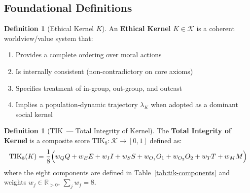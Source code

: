 \documentclass[11pt,a4paper]{article}
\theoremstyle{definition}
\newtheorem{definition}[theorem]{Definition}
\theoremstyle{remark}
\newcommand{\TIKeight}{\text{TIK}_8}
\newcommand{\KernelSpace}{\mathcal{K}}
\begin{document}
\subsection{Foundational Definitions}
\label{sec:tik-defs}

\begin{definition}[Ethical Kernel $K$]
\label{def:kernel}
An \textbf{Ethical Kernel} $K \in \KernelSpace$ is a coherent
worldview/value system that:
\begin{enumerate}[noitemsep, label=(\roman*)]
  \item Provides a complete ordering over moral actions
  \item Is internally consistent (non-contradictory on core axioms)
  \item Specifies treatment of in-group, out-group, and outcast
  \item Implies a population-dynamic trajectory $\lambda_K$
    when adopted as a dominant social kernel
\end{enumerate}
\end{definition}

\begin{definition}[TIK~--- Total Integrity of Kernel]
\label{def:tik}
The \textbf{Total Integrity of Kernel} is a composite score
$\TIKeight: \KernelSpace \to [0,1]$ defined as:
\begin{equation}
  \TIKeight(K) = \frac{1}{8}
  \Bigl(w_Q Q + w_E E + w_I I + w_S S
        + w_{O_1} O_1 + w_{O_2} O_2
        + w_T T + w_M M\Bigr)
  \label{eq:tik8}
\end{equation}
where the eight components are defined in
Table~\ref{tab:tik-components} and weights
$w_j \in \mathbb{R}_{>0}$, $\sum_j w_j = 8$.
\end{definition}
\end{document}
